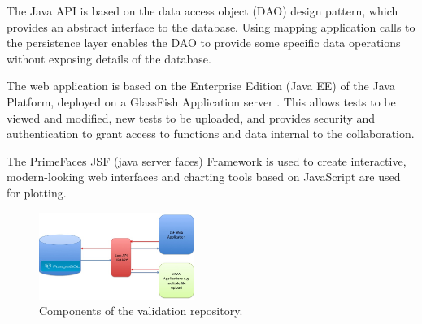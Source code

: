 The Java API is based on the data access object (DAO) design pattern, which  
provides an abstract interface to the database.  Using mapping application calls
to the persistence layer enables the DAO to provide some specific data 
operations without exposing details of the database.

The web application \cite{PVT:home} is based on the Enterprise Edition (Java EE)
\cite{PVT:javaee} of the Java Platform, deployed on a GlassFish Application
server \cite{PVT:glassfish}.  This allows tests to be viewed and modified, new 
tests to be uploaded, and provides security and authentication to grant access 
to functions and data internal to the \Gfour{} collaboration.
 
The PrimeFaces JSF (java server faces) Framework \cite{PVT:primefaces} is used
to create interactive, modern-looking web interfaces and charting tools based
on JavaScript are used for plotting.

\begin{figure}[htb]
\includegraphics[width=0.45\textwidth]{figures/Components.jpg}
  \caption{Components of the \Gfour{} validation repository.} 
  \label{fig:webapp}
\end{figure}
